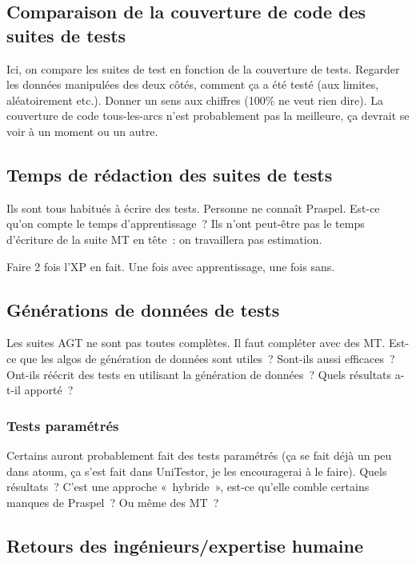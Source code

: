 
\subsection{Comparaison de la couverture de code des suites de tests}

Ici, on compare les suites de test en fonction de la couverture de tests.
Regarder les données manipulées des deux côtés, comment ça a été testé (aux
limites, aléatoirement etc.). Donner un sens aux chiffres (100\% ne veut rien
dire). La couverture de code tous-les-arcs n'est probablement pas la meilleure,
ça devrait se voir à un moment ou un autre.

\subsection{Temps de rédaction des suites de tests}

Ils sont tous habitués à écrire des tests. Personne ne connaît Praspel. Est-ce
qu'on compte le temps d'apprentissage~? Ils n'ont peut-être pas le temps
d'écriture de la suite MT en tête~: on travaillera pas estimation.

Faire 2 fois l'XP en fait. Une fois avec apprentissage, une fois sans.

\subsection{Générations de données de tests}

Les suites AGT ne sont pas toutes complètes. Il faut compléter avec des MT.
Est-ce que les algos de génération de données sont utiles~? Sont-ils aussi
efficaces~? Ont-ils réécrit des tests en utilisant la génération de données~?
Quels résultats a-t-il apporté~?

\subsubsection{Tests paramétrés}

Certains auront probablement fait des tests paramétrés (ça se fait déjà un peu
dans atoum, ça s'est fait dans UniTestor, je les encouragerai à le faire). Quels
résultats~? C'est une approche «~hybride~», est-ce qu'elle comble certains
manques de Praspel~? Ou même des MT~?

\subsection{Retours des ingénieurs/expertise humaine}

